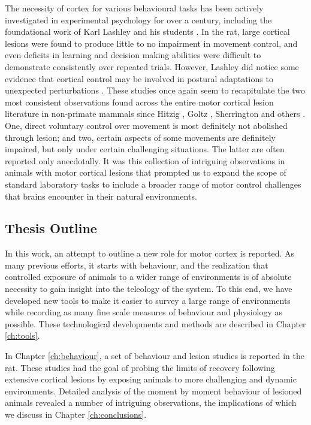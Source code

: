 The necessity of cortex for various behavioural tasks has been actively investigated in experimental psychology for over a century, including the foundational work of Karl Lashley and his students \cite{Lashley1921a,Lashley1950a}. In the rat, large cortical lesions were found to produce little to no impairment in movement control, and even deficits in learning and decision making abilities were difficult to demonstrate consistently over repeated trials. However, Lashley did notice some evidence that cortical control may be involved in postural adaptations to unexpected perturbations \cite{Lashley1921a}. These studies once again seem to recapitulate the two most consistent observations found across the entire motor cortical lesion literature in non-primate mammals since Hitzig \cite{Fritsch1870}, Goltz \cite{Goltz1888}, Sherrington \cite{Sherrington1885} and others \cite{Oakley1979,Terry1989}. One, direct voluntary control over movement is most definitely not abolished through lesion; and two, certain aspects of some movements are definitely impaired, but only under certain challenging situations. The latter are often reported only anecdotally. It was this collection of intriguing observations in animals with motor cortical lesions that prompted us to expand the scope of standard laboratory tasks to include a broader range of motor control challenges that brains encounter in their natural environments.

\subsection{Thesis Outline}

In this work, an attempt to outline a new role for motor cortex is reported. As many previous efforts, it starts with behaviour, and the realization that controlled exposure of animals to a wider range of environments is of absolute necessity to gain insight into the teleology of the system. To this end, we have developed new tools to make it easier to survey a large range of environments while recording as many fine scale measures of behaviour and physiology as possible. These technological developments and methods are described in Chapter \ref{ch:tools}.

In Chapter \ref{ch:behaviour}, a set of behaviour and lesion studies is reported in the rat. These studies had the goal of probing the limits of recovery following extensive cortical lesions by exposing animals to more challenging and dynamic environments. Detailed analysis of the moment by moment behaviour of lesioned animals revealed a number of intriguing observations, the implications of which we discuss in Chapter \ref{ch:conclusions}.


